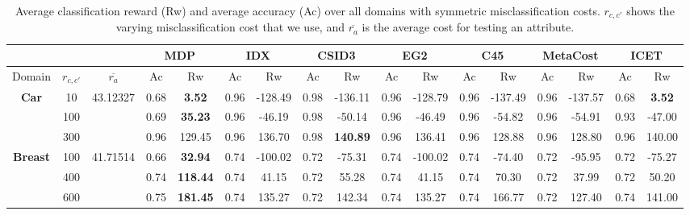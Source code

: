 \documentclass[letterpaper]{article}
\theoremstyle{definition}
\begin{document}
\begin{table}[h]
\centering
\scriptsize
\caption{Average classification reward (Rw) and average accuracy (Ac) over all domains with symmetric misclassification costs. $r_{c,c'}$ shows the varying misclassification cost that we use, and $\overline{r_a}$ is the average cost for testing an attribute.}
\label{tbl:symetric}
\begin{tabular}{|c|c|c|c|c|c|c|c|c|c|c|c|c|c|c|c|c|}
\hline
&&& \multicolumn{2}{c|}{MDP}     & \multicolumn{2}{c|}{IDX} & \multicolumn{2}{c|}{CSID3}   & \multicolumn{2}{c|}{EG2} & \multicolumn{2}{c|}{C45}    & \multicolumn{2}{c|}{MetaCost} & \multicolumn{2}{c|}{ICET}    \\ \hline
Domain&$r_{c,c'}$&$\overline{r_a}$&Ac&Rw&Ac&Rw&Ac&Rw&Ac&Rw&Ac&Rw&Ac&Rw&Ac&Rw \\ \hline
\multirow{3}{*}{\textbf{Car}}       & 10       & 43.12327 & 0.68  & \textbf{3.52}    & 0.96  & -128.49          & 0.98   & -136.11           & 0.96      & -128.79      & 0.96  & -137.49          & 0.96     & -137.57            & 0.68   & \textbf{3.52}    \\ \cline{2-17} 
                                    & 100      &          & 0.69  & \textbf{35.23}   & 0.96  & -46.19           & 0.98   & -50.14            & 0.96      & -46.49       & 0.96  & -54.82           & 0.96     & -54.91             & 0.93   & -47.00           \\ \cline{2-17} 
                                    & 300      &          & 0.96  & 129.45           & 0.96  & 136.70           & 0.98   & \textbf{140.89}   & 0.96      & 136.41       & 0.96  & 128.88           & 0.96     & 128.80             & 0.96   & 140.00           \\ \hline
\multirow{3}{*}{\textbf{Breast}}    & 100      & 41.71514 & 0.66  & \textbf{32.94}   & 0.74  & -100.02          & 0.72   & -75.31            & 0.74      & -100.02      & 0.74  & -74.40           & 0.72     & -95.95              & 0.72   & -75.27           \\ \cline{2-17} 
                                    & 400      &          & 0.74  & \textbf{118.44}  & 0.74  & 41.15            & 0.72   & 55.28             & 0.74      & 41.15        & 0.74  & 70.30            & 0.72     & 37.99              & 0.72   & 50.20            \\ \cline{2-17} 
                                    & 600      &          & 0.75  & \textbf{181.45}  & 0.74  & 135.27           & 0.72   & 142.34            & 0.74      & 135.27       & 0.74  & 166.77           & 0.72     & 127.40             & 0.74   & 141.00           \\ \hline

\end{tabular}
\end{table}
\end{document}

